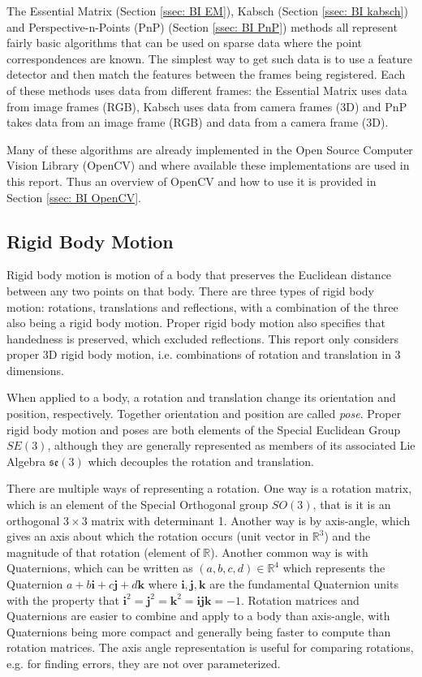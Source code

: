 \documentclass[12pt,a4paper]{article}
\begin{document}
  The Essential Matrix (Section \ref{ssec: BI EM}), Kabsch (Section \ref{ssec: BI kabsch}) and Perspective-n-Points (PnP) (Section \ref{ssec: BI PnP}) methods all represent fairly basic algorithms that can be used on sparse data where the point correspondences are known. The simplest way to get such data is to use a feature detector and then match the features between the frames being registered. Each of these methods uses data from different frames: the Essential Matrix uses data from image frames (RGB), Kabsch uses data from camera frames (3D) and PnP takes data from an image frame (RGB) and data from a camera frame (3D).
   
  Many of these algorithms are already implemented in the Open Source Computer Vision Library (OpenCV) and where available these implementations are used in this report. Thus an overview of OpenCV and how to use it is provided in Section \ref{ssec: BI OpenCV}.

  \subsection{Rigid Body Motion}
    \label{ssec: BI motion}
    Rigid body motion is motion of a body that preserves the Euclidean distance between any two points on that body. There are three types of rigid body motion: rotations, translations and reflections, with a combination of the three also being a rigid body motion. Proper rigid body motion also specifies that handedness is preserved, which excluded reflections. This report only considers proper 3D rigid body motion, i.e. combinations of rotation and translation in 3 dimensions.
     
    When applied to a body, a rotation and translation change its orientation and position, respectively. Together orientation and position are called \textit{pose}. Proper rigid body motion and poses are both elements of the Special Euclidean Group $SE(3)$, although they are generally represented as members of its associated Lie Algebra $\mathfrak{se}(3)$ which decouples the rotation and translation.
     
    There are multiple ways of representing a rotation. One way is a rotation matrix, which is an element of the Special Orthogonal group $SO(3)$, that is it is an orthogonal $3\times 3$ matrix with determinant 1. Another way is by axis-angle, which gives an axis about which the rotation occurs (unit vector in $\mathbb{R}^3$) and the magnitude of that rotation (element of $\mathbb{R}$). Another common way is with Quaternions, which can be written as $(a,b,c,d) \in \mathbb{R}^4$ which represents the Quaternion $a+b\textbf{i} + c\textbf{j} + d\textbf{k}$ where $\textbf{i}, \textbf{j}, \textbf{k}$ are the fundamental Quaternion units with the property that $\textbf{i}^2=\textbf{j}^2=\textbf{k}^2=\textbf{ijk}=-1$. Rotation matrices and Quaternions are easier to combine and apply to a body than axis-angle, with Quaternions being more compact and generally being faster to compute than rotation matrices. The axis angle representation is useful for comparing rotations, e.g. for finding errors, they are not over parameterized. 
     
\end{document}

